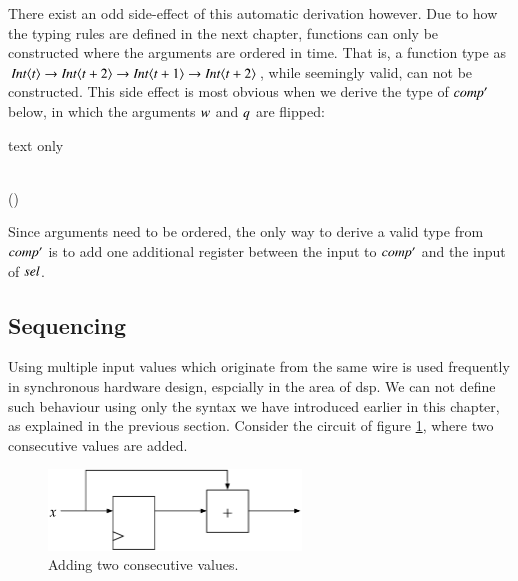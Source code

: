 There exist an odd side-effect of this automatic derivation however.
Due to how the typing rules are defined in the next chapter, functions can only be constructed where the arguments are ordered in time.
That is, a function type as \ensuremath{\Conid{Int}\langle\Varid{t}\rangle\to \Conid{Int}\langle\Varid{t}\mathbin{+}\mathrm{2}\rangle\to \Conid{Int}\langle\Varid{t}\mathbin{+}\mathrm{1}\rangle\to \Conid{Int}\langle\Varid{t}\mathbin{+}\mathrm{2}\rangle}, while seemingly valid, can not be constructed.
This side effect is most obvious when we derive the type of \ensuremath{\Varid{comp'}} below, in which the arguments \ensuremath{\Varid{w}} and \ensuremath{\Varid{q}} are flipped:
\begin{changemargin}{1cm}{0cm}
\begin{expansionno}{text only}\begin{hscode}\SaveRestoreHook
{}%
%
%
\>[3]{}\mathbin{::}\langle{}\rangle\to {}\langle{}\rangle\to {}\langle{}\mathbin{+}\rangle{}\<[E]%
\\
\>[3]{}\;\;\mathrel{=}\;\;\;(\;){}\<[E]%
\ColumnHook
\end{hscode}\resethooks
\end{expansionno}
\end{changemargin}

Since arguments need to be ordered, the only way to derive a valid type from \ensuremath{\Varid{comp'}} is to add one additional register between the input to \ensuremath{\Varid{comp'}} and the input of \ensuremath{\Varid{sel}}. 

\subsection{Sequencing}
Using multiple input values which originate from the same wire is used frequently in synchronous hardware design, espcially in the area of \gls{dsp}.
We can not define such behaviour using only the syntax we have introduced earlier in this chapter, as explained in the previous section.
Consider the circuit of figure \ref{fig:sum2}, where two consecutive values are added.

\begin{figure}[H]
\begin{center}
\centering
\includegraphics[width=0.6\textwidth]{images/sum2}
\end{center}
\caption{Adding two consecutive values.} \label{fig:sum2}
\end{figure}

